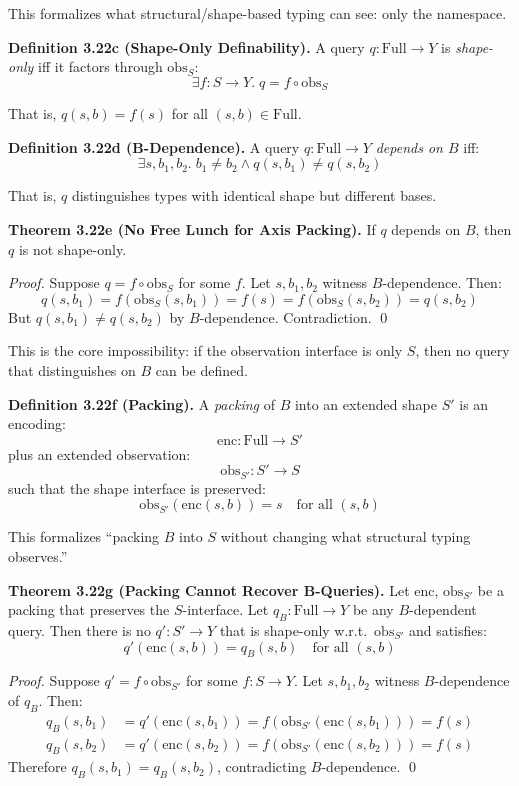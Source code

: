 This formalizes what structural/shape-based typing can see: only the namespace.

\textbf{Definition 3.22c (Shape-Only Definability).} A query $q : \text{Full} \to Y$ is \emph{shape-only} iff it factors through $\text{obs}_S$:
\[\exists f : S \to Y.\; q = f \circ \text{obs}_S\]

That is, $q(s, b) = f(s)$ for all $(s, b) \in \text{Full}$.

\textbf{Definition 3.22d (B-Dependence).} A query $q : \text{Full} \to Y$ \emph{depends on $B$} iff:
\[\exists s, b_1, b_2.\; b_1 \neq b_2 \land q(s, b_1) \neq q(s, b_2)\]

That is, $q$ distinguishes types with identical shape but different bases.

\textbf{Theorem 3.22e (No Free Lunch for Axis Packing).} If $q$ depends on $B$, then $q$ is not shape-only.

\emph{Proof.} Suppose $q = f \circ \text{obs}_S$ for some $f$. Let $s, b_1, b_2$ witness $B$-dependence. Then:
\[q(s, b_1) = f(\text{obs}_S(s, b_1)) = f(s) = f(\text{obs}_S(s, b_2)) = q(s, b_2)\]
But $q(s, b_1) \neq q(s, b_2)$ by $B$-dependence. Contradiction. \qed

This is the core impossibility: if the observation interface is only $S$, then no query that distinguishes on $B$ can be defined.

\textbf{Definition 3.22f (Packing).} A \emph{packing} of $B$ into an extended shape $S'$ is an encoding:
\[\text{enc} : \text{Full} \to S'\]
plus an extended observation:
\[\text{obs}_{S'} : S' \to S\]
such that the shape interface is preserved:
\[\text{obs}_{S'}(\text{enc}(s, b)) = s \quad \text{for all } (s, b)\]

This formalizes ``packing $B$ into $S$ without changing what structural typing observes.''

\textbf{Theorem 3.22g (Packing Cannot Recover B-Queries).} Let $\text{enc}$, $\text{obs}_{S'}$ be a packing that preserves the $S$-interface. Let $q_B : \text{Full} \to Y$ be any $B$-dependent query. Then there is no $q' : S' \to Y$ that is shape-only w.r.t.\ $\text{obs}_{S'}$ and satisfies:
\[q'(\text{enc}(s, b)) = q_B(s, b) \quad \text{for all } (s, b)\]

\emph{Proof.} Suppose $q' = f \circ \text{obs}_{S'}$ for some $f : S \to Y$. Let $s, b_1, b_2$ witness $B$-dependence of $q_B$. Then:
\begin{align*}
q_B(s, b_1) &= q'(\text{enc}(s, b_1)) = f(\text{obs}_{S'}(\text{enc}(s, b_1))) = f(s) \\
q_B(s, b_2) &= q'(\text{enc}(s, b_2)) = f(\text{obs}_{S'}(\text{enc}(s, b_2))) = f(s)
\end{align*}
Therefore $q_B(s, b_1) = q_B(s, b_2)$, contradicting $B$-dependence. \qed

